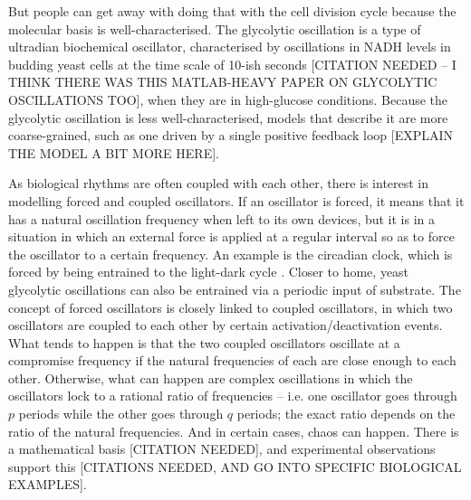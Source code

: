 But people can get away with doing that with the cell division cycle because the molecular basis is well-characterised.
The glycolytic oscillation is a type of ultradian biochemical oscillator, characterised by oscillations in NADH levels in budding yeast cells at the time scale of 10-ish seconds [CITATION NEEDED -- I THINK THERE WAS THIS MATLAB-HEAVY PAPER ON GLYCOLYTIC OSCILLATIONS TOO], when they are in high-glucose conditions.
Because the glycolytic oscillation is less well-characterised, models that describe it are more coarse-grained, such as one driven by a single positive feedback loop \parencite{goldbeterMultisynchronizationOtherPatterns} [EXPLAIN THE MODEL A BIT MORE HERE]. %

As biological rhythms are often coupled with each other, there is interest in modelling forced and coupled oscillators.
If an oscillator is forced, it means that it has a natural oscillation frequency when left to its own devices, but it is in a situation in which an external force is applied at a regular interval so as to force the oscillator to a certain frequency.
An example is the circadian clock, which is forced by being entrained to the light-dark cycle \parencite{goldbeterMultisynchronizationOtherPatterns}.
Closer to home, yeast glycolytic oscillations can also be entrained via a periodic input of substrate.
The concept of forced oscillators is closely linked to coupled oscillators, in which two oscillators are coupled to each other by certain activation/deactivation events.
What tends to happen is that the two coupled oscillators oscillate at a compromise frequency if the natural frequencies of each are close enough to each other.
Otherwise, what can happen are complex oscillations in which the oscillators lock to a rational ratio of frequencies -- i.e. one oscillator goes through $p$ periods while the other goes through $q$ periods; the exact ratio depends on the ratio of the natural frequencies.
And in certain cases, chaos can happen.
There is a mathematical basis [CITATION NEEDED], and experimental observations support this [CITATIONS NEEDED, AND GO INTO SPECIFIC BIOLOGICAL EXAMPLES].

